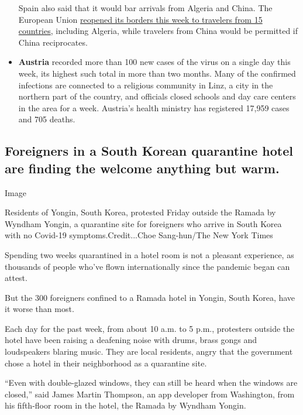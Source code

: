 \begin{itemize}
  Spain also said that it would bar arrivals from Algeria and China. The
  European Union
  \href{https://www.nytimes3xbfgragh.onion/2020/06/30/world/europe/eu-reopening-blocks-us-travelers.html}{reopened
  its borders this week to travelers from 15 countries}, including
  Algeria, while travelers from China would be permitted if China
  reciprocates.
\item
  \textbf{Austria} recorded more than 100 new cases of the virus on a
  single day this week, its highest such total in more than two months.
  Many of the confirmed infections are connected to a religious
  community in Linz, a city in the northern part of the country, and
  officials closed schools and day care centers in the area for a week.
  Austria's health ministry has registered 17,959 cases and 705 deaths.
\end{itemize}

\hypertarget{foreigners-in-a-south-korean-quarantine-hotel-are-finding-the-welcome-anything-but-warm}{%
\subsection{Foreigners in a South Korean quarantine hotel are finding
the welcome anything but
warm.}\label{foreigners-in-a-south-korean-quarantine-hotel-are-finding-the-welcome-anything-but-warm}}

Image

Residents of Yongin, South Korea, protested Friday outside the Ramada by
Wyndham Yongin, a quarantine site for foreigners who arrive in South
Korea with no Covid-19 symptoms.Credit...Choe Sang-hun/The New York
Times

Spending two weeks quarantined in a hotel room is not a pleasant
experience, as thousands of people who've flown internationally since
the pandemic began can attest.

But the 300 foreigners confined to a Ramada hotel in Yongin, South
Korea, have it worse than most.

Each day for the past week, from about 10 a.m. to 5 p.m., protesters
outside the hotel have been raising a deafening noise with drums, brass
gongs and loudspeakers blaring music. They are local residents, angry
that the government chose a hotel in their neighborhood as a quarantine
site.

``Even with double-glazed windows, they can still be heard when the
windows are closed,'' said James Martin Thompson, an app developer from
Washington, from his fifth-floor room in the hotel, the Ramada by
Wyndham Yongin.

